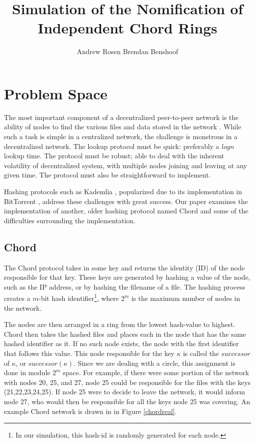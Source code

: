 \documentclass[12pt]{article} %
\title{Simulation of the Nomification of Independent Chord Rings}
\author{Andrew Rosen \qquad Brendan Benshoof }
\date{} %
\begin{document}
\maketitle
\newpage
\section{Problem Space}

The most important component of a decentralized peer-to-peer network is the ability of nodes to find the various files and data stored in the network \cite{Chord}.  While such a task is simple in a centralized network, the challenge is monstrous in a decentralized network.  The lookup protocol must be quick:  preferably a $log n$ lookup time.  The protocol must be robust; able to deal with the inherent volatility of decentralized system, with multiple nodes joining and leaving at any given time.  The protocol must also be straightforward to implement.

Hashing protocols such as Kademlia \cite{Kademlia}, popularized due to its implementation in BitTorrent \cite{BitTorrent}, address these challenges with great success.  Our paper examines the implementation of another, older hashing protocol named Chord \cite{Chord} and some of the difficulties surrounding the implementation.
\subsection{Chord}

The Chord protocol \cite{Chord} takes in some key and returns the identity (ID) of the node responsible for that key.  These keys are generated by hashing a value of the node, such as the IP address, or by hashing  the filename of a file.  The hashing process creates a $m$-bit hash identifier\footnote{In our simulation, this hash-id is randomly generated for each node.}, where $2^m$ is the maximum number of nodes in the network.

The nodes are then arranged in a ring from the lowest hash-value to highest.  Chord then takes the hashed files and places each in the node that has the same hashed identifier as it.  If no such node exists, the node with the first identifier that follows this value.  This node responsible for the key $\kappa$ is called the $successor$ of $\kappa$, or $successor(\kappa)$.  Since we are dealing with a circle, this assignment is done in module $2^m$ space.  For example, if there were some portion of the network with nodes 20, 25, and 27, node 25 could be responsible for the files with the keys (21,22,23,24,25). If node 25 were to decide to leave the network, it would inform node 27, who would then be responsible for all the keys node 25 was covering. An example Chord network is drawn in in Figure \ref{chordreal}.
\end{document}
